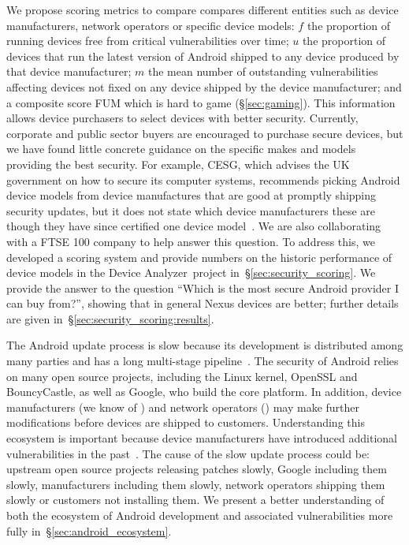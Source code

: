 \documentclass{sig-alternate-2013}
\newcommand{\da}{Device Analyzer}
\begin{document}
We propose scoring metrics to compare compares different entities such as device manufacturers, network operators or specific device models:
$f$ the proportion of running devices free from critical vulnerabilities over time;
$u$ the proportion of devices that run the latest version of Android shipped to any device produced by that device manufacturer;
$m$ the mean number of outstanding vulnerabilities affecting devices not fixed on any device shipped by the device manufacturer;
and a composite score FUM which is hard to game (\S\ref{sec:gaming}).
This information allows device purchasers to select devices with better security.
Currently, corporate and public sector buyers are encouraged to purchase secure devices, but we have found little concrete guidance on the specific makes and models providing the best security.
For example, CESG, which advises the UK government on how to secure its computer systems, recommends picking Android device models from device manufactures that are good at promptly shipping security updates, but it does not state which device manufacturers these are~\cite{CESG2013} though they have since certified one device model~\cite{CESG2015}.
We are also collaborating with a FTSE 100 company to help answer this question.
To address this, we developed a scoring system and provide numbers on the historic performance of device models in the \da\ project in~\S\ref{sec:security_scoring}.
We provide the answer to the question ``Which is the most secure Android provider I can buy from?'', showing that in general Nexus devices are better; further details are given in~\S\ref{sec:security_scoring:results}.

The Android update process is slow because its development is distributed among many parties and has a long multi-stage pipeline~\cite{HTC2013}.
The security of Android relies on many open source projects, including the Li\-nux kernel, Open\-SSL and Bouncy\-Castle, as well as Google, who build the core platform.
In addition, device manufacturers (we know of \daNumManufacturers) and network operators (\daNumOperators) may make further modifications before devices are shipped to customers.
Understanding this ecosystem is important because device manufacturers have introduced additional vulnerabilities in the past~\cite{Grace2012}.
The cause of the slow update process could be: upstream open source projects releasing patches slowly, Google including them slowly, manufacturers including them slowly, network operators shipping them slowly or customers not installing them.
We present a better understanding of both the ecosystem of Android development and associated vulnerabilities more fully in~\S\ref{sec:android_ecosystem}.
\end{document}
